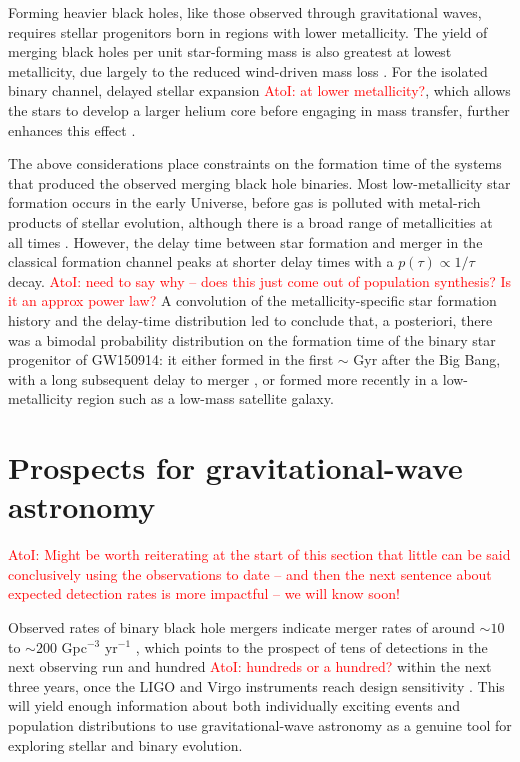 \documentclass[iop,onecolumn]{revtex4}
\newcommand{\ajf}[1]{\textcolor{red}{AtoI: #1}}
\begin{document}
Forming heavier black holes, like those observed through gravitational waves, requires stellar progenitors born in regions with lower metallicity. The yield of merging black holes per unit star-forming mass is also greatest at lowest metallicity, due largely to the reduced wind-driven mass loss \citep[e.g.,][]{Belczynski:2010}. For the isolated binary channel, delayed stellar expansion \ajf{at lower metallicity?}, which allows the stars to develop a larger helium core before engaging in mass transfer, further enhances this effect \citep[e.g.,][]{Stevenson:2017}.

The above considerations place constraints on the formation time of the systems that produced the observed merging black hole binaries. Most low-metallicity star formation occurs in the early Universe, before gas is polluted with metal-rich products of stellar evolution, although there is a broad range of metallicities at all times \citep[e.g.,][]{LangerNorman:2006,TaylorKobayashi:2015}. However, the delay time between star formation and merger in the classical formation channel peaks at shorter delay times with a $p(\tau) \propto 1/\tau$ decay. \ajf{need to say why -- does this just come out of population synthesis? Is it an approx power law?} A convolution of the metallicity-specific star formation history and the delay-time distribution led \citet{Belczynski:2016} to conclude that, a posteriori, there was a bimodal probability distribution on the formation time of the binary star progenitor of GW150914: it either formed in the first $\sim$ Gyr after the Big Bang, with a long subsequent delay to merger \citep{Dominik:2014}, or formed more recently in a low-metallicity region such as a low-mass satellite galaxy.  

  

\section{Prospects for gravitational-wave astronomy}\label{prospect}

\ajf{Might be worth reiterating at the start of this section that little can be said conclusively using the observations to date -- and then the next sentence about expected detection rates is more impactful -- we will know soon!}

Observed rates of binary black hole mergers indicate merger rates of around $\sim 10$ to $\sim 200$ Gpc$^{-3}$ yr$^{-1}$ \citep{GW150914:rates,GW170104}, which points to the prospect of tens of detections in the next observing run and hundred \ajf{hundreds or a hundred?} within the next three years, once the LIGO and Virgo instruments reach design sensitivity \citep{scenarios}.  This will yield enough information about both individually exciting events and population distributions to use gravitational-wave astronomy as a genuine tool for exploring stellar and binary evolution.  
\end{document}
